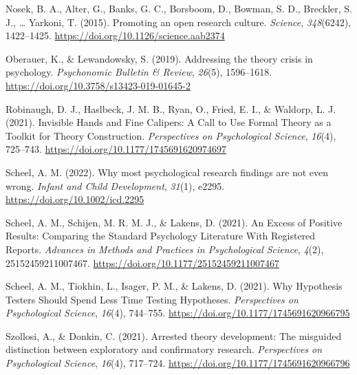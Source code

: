 \documentclass[
  man]{apa6}
\newlength{\cslhangindent}
\newenvironment{CSLReferences}[2] %
 {\begin{list}{}{%
  \setlength{\itemindent}{0pt}
  \setlength{\leftmargin}{0pt}
  \setlength{\parsep}{0pt}
  \ifodd #1
   \setlength{\leftmargin}{\cslhangindent}
   \setlength{\itemindent}{-1\cslhangindent}
  \fi
  \setlength{\itemsep}{#2\baselineskip}}}
 {\end{list}}
\begin{document}
\begin{CSLReferences}{1}{0}
Nosek, B. A., Alter, G., Banks, G. C., Borsboom, D., Bowman, S. D., Breckler, S. J., \ldots{} Yarkoni, T. (2015). Promoting an open research culture. \emph{Science}, \emph{348}(6242), 1422--1425. \url{https://doi.org/10.1126/science.aab2374}

Oberauer, K., \& Lewandowsky, S. (2019). Addressing the theory crisis in psychology. \emph{Psychonomic Bulletin \& Review}, \emph{26}(5), 1596--1618. \url{https://doi.org/10.3758/s13423-019-01645-2}

Robinaugh, D. J., Haslbeck, J. M. B., Ryan, O., Fried, E. I., \& Waldorp, L. J. (2021). Invisible {Hands} and {Fine Calipers}: {A Call} to {Use Formal Theory} as a {Toolkit} for {Theory Construction}. \emph{Perspectives on Psychological Science}, \emph{16}(4), 725--743. \url{https://doi.org/10.1177/1745691620974697}

Scheel, A. M. (2022). Why most psychological research findings are not even wrong. \emph{Infant and Child Development}, \emph{31}(1), e2295. \url{https://doi.org/10.1002/icd.2295}

Scheel, A. M., Schijen, M. R. M. J., \& Lakens, D. (2021). An {Excess} of {Positive Results}: {Comparing} the {Standard Psychology Literature With Registered Reports}. \emph{Advances in Methods and Practices in Psychological Science}, \emph{4}(2), 25152459211007467. \url{https://doi.org/10.1177/25152459211007467}

Scheel, A. M., Tiokhin, L., Isager, P. M., \& Lakens, D. (2021). Why {Hypothesis Testers Should Spend Less Time Testing Hypotheses}. \emph{Perspectives on Psychological Science}, \emph{16}(4), 744--755. \url{https://doi.org/10.1177/1745691620966795}

Szollosi, A., \& Donkin, C. (2021). Arrested theory development: {The} misguided distinction between exploratory and confirmatory research. \emph{Perspectives on Psychological Science}, \emph{16}(4), 717--724. \url{https://doi.org/10.1177/1745691620966796}

\end{CSLReferences}
\end{document}
